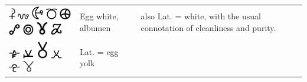 \documentclass[british,final,landscape]{scrartcl}
\begin{document}
\begin{refsection}
\begin{supertabular}{p{0.3\textwidth}p{0.34\textwidth}p{0.34\textwidth}}
   \includegraphics[height=5mm]{Animal/Albumen} \includegraphics[width=5mm]{Animal/Albumen2} \includegraphics[width=5mm]{Animal/Albumen3} \includegraphics[width=5mm]{Animal/Albumen4} \includegraphics[width=5mm]{Animal/Albumen5} \includegraphics[width=5mm]{Animal/Albumen6} \includegraphics[width=5mm]{Animal/Albumen7} \includegraphics[width=5mm]{Animal/Albumen8} \includegraphics[width=5mm]{Animal/Albumen9} & Egg white, albumen   & also Lat.  = white, with the usual connotation of cleanliness and purity. \\
   \includegraphics[width=5mm]{Animal/EggYolk} \includegraphics[width=5mm]{Animal/EggYolk2} \includegraphics[width=5mm]{Animal/EggYolk3} \includegraphics[width=5mm]{Animal/EggYolk4} \includegraphics[width=5mm]{Animal/EggYolk5} \includegraphics[width=5mm]{Animal/EggYolk6} & Lat.  = egg yolk & \\

\end{supertabular}
\end{refsection}
\end{document}
